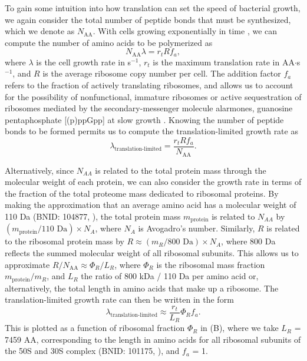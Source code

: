 To gain some intuition into how translation can set the speed of
bacterial growth, we again consider the total number of peptide bonds that must
be synthesized, which we denote as $N_\text{AA}$. With cells growing exponentially in time
\citep{godin2010}, we can compute the number of amino acids to be polymerized as
\begin{equation}
    N_\text{AA} \lambda = r_t R f_a,
    \label{eq:mass_balance}
\end{equation} where
$\lambda$ is the cell growth rate in s$^{-1}$, $r_t$ is the maximum translation
rate in AA$\cdot$s$^{-1}$, and $R$ is the average ribosome copy number per cell.
The addition factor $f_a$ refers to the fraction of actively translating
ribosomes, and allows us to account for the possibility of nonfunctional,
immature ribosomes or active sequestration of ribosomes mediated by
 the secondary-messenger
 molecule alarmones, guanosine pentaphosphate [(p)ppGpp] at
slow growth \citep{dennis2004, dai2016}. Knowing the number of peptide bonds to
be formed permits us to compute the translation-limited growth rate as
\begin{equation}
\lambda_\text{translation-limited} = \frac{r_t R f_a}{N_\text{AA}}.
\end{equation}

Alternatively, since $N_{AA}$ is related to the total protein mass through the
molecular weight of each protein, we can also consider the growth rate in terms
of the fraction of the total proteome mass dedicated to ribosomal proteins. By
making the approximation that an average amino acid has a molecular weight of
110 Da (BNID: 104877, \cite{milo2010}), the total protein mass $m_{\textrm{protein}}$ is related to
$N_{AA}$ by $(m_{\textrm{protein}}/\text{110 Da}) \times N_A$, where $N_A$ is Avogadro's number.
Similarly, $R$ is related to the ribosomal protein mass by $R \approx
(m_R/\text{800 Da}) \times N_A$, where 800 Da reflects the summed molecular weight
of all ribosomal subunits.  This allows us to approximate  $R / N_\text{AA}
\approx \Phi_R / L_R$,  where $\Phi_R$ is the ribosomal mass fraction $m_{\textrm{protein}}/m_R$,
and $L_R$ the ratio of 800 kDa / 110 Da per amino acid or, alternatively, the
total length in amino acids that make up a ribosome. The translation-limited
growth rate can then be written in the form
\begin{equation}
\lambda_{\textrm{translation-limited}} \approx \frac{r_t}{L_R}  \Phi_R f_a.
\label{eq:translation_limit_growth_rate}
\end{equation}
This is plotted as a function of ribosomal fraction $\Phi_R$ in
(B), where we take $L_R$ = 7459 AA, corresponding to the
length in amino acids for all ribosomal subunits of the 50S and 30S complex
(BNID: 101175, \citep{milo2010}), and $f_a$ = 1.

